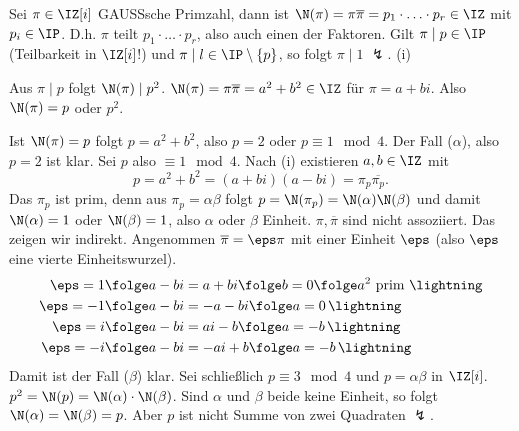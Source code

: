 \begin{Beweis}
 Sei $\pi\in\IZ[i]$ GAUSSsche Primzahl, dann ist $\N(\pi)=\pi\overline{\pi}=p_1\cdot\ldots\cdot p_r \in \IZ$ mit $p_i\in\IP$. D.h. $\pi$ teilt $p_1\cdot\ldots\cdot p_r$, also auch einen der Faktoren.
 Gilt $\pi \mid p\in \IP$ (Teilbarkeit in $\IZ[i]$!) und $\pi\mid l\in\IP\setminus\{p\}$, so folgt $\pi \mid 1$ $\lightning$. (i)\checkmark
 
 Aus $\pi\mid p$ folgt $\N(\pi)\mid p^2$. $\N(\pi)=\pi\overline{\pi}=a^2+b^2\in\IZ$ für $\pi=a+bi$. Also $\N(\pi)=p$ oder $p^2$.
 
 Ist $\N(\pi)=p$ folgt $p=a^2+b^2$, also $p=2$ oder $p\equiv 1\mod{4}$. Der Fall ($\alpha$), also $p=2$ ist klar. Sei $p$ also $\equiv 1\mod{4}$. Nach (i) existieren $a,b\in\IZ$ mit 
 \[p=a^2+b^2=(a+bi)(a-bi)=\pi_p\overline{\pi_p}. \]
 Das $\pi_p$ ist prim, denn aus $\pi_p=\alpha\beta$ folgt $p=\N(\pi_p)=\N(\alpha)\N(\beta)$ und damit $\N(\alpha)=1$ oder $\N(\beta)=1$, also $\alpha$ oder $\beta$ Einheit.
 $\pi,\overline{\pi}$ sind nicht assoziiert. Das zeigen wir indirekt. Angenommen $\overline{\pi}=\eps\pi$ mit einer Einheit $\eps$ (also $\eps$ eine vierte Einheitswurzel).
 \begin{align*}
  \eps=1 & \folge a-bi=a+bi \folge b=0 \folge a^2 \mbox{ prim } \lightning\\
  \eps=-1 &\folge a-bi=-a-bi \folge a=0\,\lightning\\
  \eps=i &\folge a-bi=ai-b \folge a=-b\,\lightning\\
  \eps=-i &\folge a-bi=-ai+b \folge a=-b\, \lightning
 \end{align*}
Damit ist der Fall ($\beta$) klar. Sei schließlich $p\equiv 3 \mod{4}$ und $p=\alpha\beta$ in $\IZ[i]$.
 $p^2=\N(p)=\N(\alpha)\cdot \N(\beta)$. Sind $\alpha$ und $\beta$ beide keine Einheit, so folgt $\N(\alpha)=\N(\beta)=p$. Aber $p$ ist nicht Summe von zwei Quadraten $\lightning$.
\end{Beweis}

